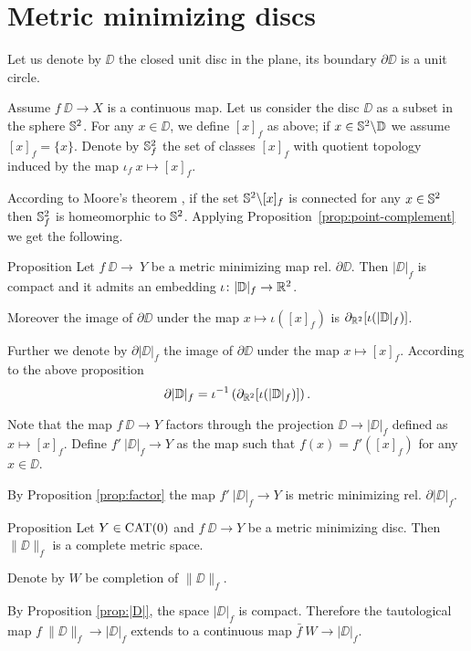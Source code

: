 \documentclass[a4paper,10pt]{amsart}
\begin{document}
\section{Metric minimizing discs}



Let us denote by $\DD$ the closed unit disc in the plane,
its boundary $\partial \DD$ is a unit circle.

Assume $f\:\DD\to X$ is a continuous map.
Let us consider the disc $\DD$ as a subset in the sphere $\mathbb{S}^2$.
For any $x\in \DD$, we define $[x]_f$ as above;
if $x\in \mathbb{S}^2\backslash \mathbb{D}$ we assume $[x]_f=\{x\}$.
Denote by $\mathbb{S}^2_f$ the set of classes $[x]_f$ with quotient topology induced by the map $\iota_f\:x\mapsto [x]_f$.

According to Moore's theorem \cite{moore},
if the set $\mathbb{S}^2\backslash[x]_f$ is connected for any $x\in \mathbb{S}^2$
then $\mathbb{S}^2_f$ is homeomorphic to $\mathbb{S}^2$.
Applying Proposition~\ref{prop:point-complement} we get the following.

\begin{thm}{Proposition}\label{prop:|D|}
Let $f\:\DD\to\ Y$ be a metric minimizing map rel. $\partial \DD$.
Then $|\DD|_f$ is compact and it admits an embedding $\iota\colon|\mathbb{D}|_f\to \mathbb{R}^2$.

Moreover the image of $\partial \DD$
under the map $x\mapsto \iota([x]_f)$
is $\partial_{\mathbb{R}^2}[\iota(|\mathbb{D}|_f)]$.
\end{thm}

Further we denote by $\partial|\DD|_f$ the image of $\partial \DD$
under the map $x\mapsto [x]_f$.
According to the above proposition 
\[\partial|\mathbb{D}|_f=\iota^{-1}\left(\partial_{\mathbb{R}^2}[\iota(|\mathbb{D}|_f)]\right).\]

Note that the map $f\:\DD\to Y$ factors through the projection 
$\DD\to|\DD|_f$ defined as $x\mapsto[x]_f$.
Define $f'\:|\DD|_f\to Y$ as the map such that $f(x)=f'([x]_f)$ for any $x\in\DD$.

By Proposition \ref{prop:factor} the map $f'\:|\DD|_f\to Y$
is metric minimizing rel. $\partial|\DD|_f$.

\begin{thm}{Proposition}
Let $Y\in\mathop{\rm CAT}\nolimits(0)$ 
and 
$f\:\DD\to Y$ be a metric minimizing disc.
Then $\|\DD\|_f$ is a complete metric space.
\end{thm}

Denote by $W$ be completion of $\|\DD\|_f$.

By Proposition \ref{prop:|D|},
the space $|\DD|_f$ is compact.
Therefore the tautological map $f\:\|\DD\|_f\to |\DD|_f$ 
extends to a continuous map $\bar f\:W\to |\DD|_f$.
\end{document}
